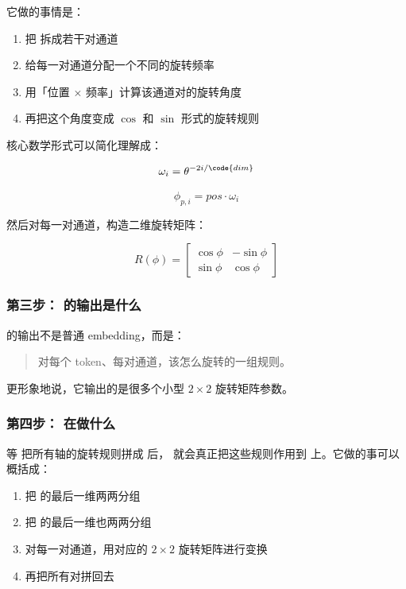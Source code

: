 它做的事情是：

\begin{enumerate}[leftmargin=1.5em]
  \item 把  拆成若干对通道
  \item 给每一对通道分配一个不同的旋转频率
  \item 用「位置 $\times$ 频率」计算该通道对的旋转角度
  \item 再把这个角度变成 $\cos$ 和 $\sin$ 形式的旋转规则
\end{enumerate}

核心数学形式可以简化理解成：

\[
\omega_i = \theta^{-2i / \code{dim}}
\]

\[
\phi_{p,i} = pos \cdot \omega_i
\]

然后对每一对通道，构造二维旋转矩阵：

\[
R(\phi)=
\begin{bmatrix}
\cos \phi & -\sin \phi \\
\sin \phi & \cos \phi
\end{bmatrix}
\]

\subsubsection{第三步： 的输出是什么}

 的输出不是普通 embedding，而是：

\begin{quote}
对每个 token、每对通道，该怎么旋转的一组规则。
\end{quote}

更形象地说，它输出的是很多个小型 $2 \times 2$ 旋转矩阵参数。

\subsubsection{第四步： 在做什么}

等  把所有轴的旋转规则拼成  后， 就会真正把这些规则作用到  上。它做的事可以概括成：

\begin{enumerate}[leftmargin=1.5em]
  \item 把  的最后一维两两分组
  \item 把  的最后一维也两两分组
  \item 对每一对通道，用对应的 $2 \times 2$ 旋转矩阵进行变换
  \item 再把所有对拼回去
\end{enumerate}

